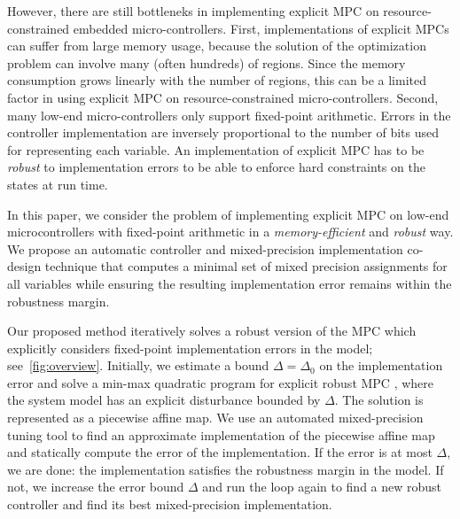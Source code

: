 However, there are still bottleneks in implementing explicit MPC on resource-constrained embedded micro-controllers.
First, implementations of explicit MPCs can suffer from large memory usage, because the solution of the optimization
problem can involve many (often hundreds) of regions.
Since the memory consumption grows linearly with the number of regions, 
this can be a limited factor in using explicit MPC on resource-constrained micro-controllers.
Second, many low-end micro-controllers only support fixed-point arithmetic.
Errors in the controller implementation are inversely proportional to the number of bits used for representing each variable. 
An implementation of explicit MPC has to be \emph{robust} to 
implementation errors to be able to enforce hard constraints on the states at run time.

In this paper, we consider the problem of implementing explicit MPC on low-end microcontrollers with fixed-point arithmetic
in a \emph{memory-efficient} and \emph{robust} way.
We propose an automatic controller and mixed-precision implementation co-design technique that computes a minimal set of mixed
precision assignments for all variables while ensuring the resulting implementation error remains within the robustness margin.  


Our proposed method iteratively solves a robust version of the MPC which explicitly considers fixed-point implementation errors
in the model; see~\autoref{fig:overview}.
Initially, we estimate a bound $\Delta = \Delta_0$ on the implementation error and solve a
min-max quadratic program for explicit robust MPC \cite{delaPea:2005}, where the system
model has an explicit disturbance bounded by $\Delta$.
The solution is represented as a piecewise affine map.
We use an automated mixed-precision tuning tool to find an approximate implementation of the piecewise affine
map and statically compute the error of the implementation.
If the error is at most $\Delta$, we are done: the implementation satisfies the robustness margin in the model.
If not, we increase the error bound $\Delta$ and run the loop again to find a new robust controller and find its best mixed-precision
implementation.

